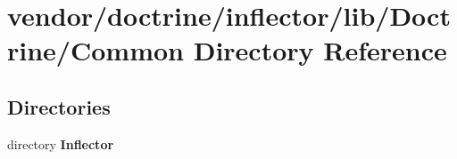 \section{vendor/doctrine/inflector/lib/\+Doctrine/\+Common Directory Reference}
\label{dir_cda680aa0f4259b2d21f86acc896a03b}
\subsection*{Directories}
\begin{DoxyCompactItemize}
\item 
directory {\bf Inflector}
\end{DoxyCompactItemize}

